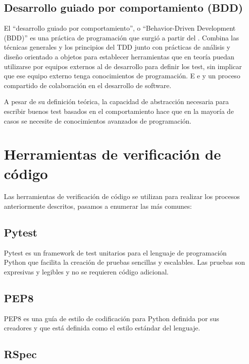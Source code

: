 \subsection {Desarrollo guiado por comportamiento (BDD)}

El ``desarrollo guiado por comportamiento'', o ``Behavior-Driven Development (BDD)'' es una práctica de programación que surgió a partir del . Combina las técnicas generales y los principios del TDD junto con prácticas de análisis y diseño orientado a objetos para establecer herramientas que en teoría puedan utilizarse por equipos externos al de desarrollo para definir los test, sin implicar que ese equipo externo tenga conocimientos de programación. E e y un proceso compartido de colaboración en el desarrollo de software.

\bigskip
A pesar de su definición teórica, la capacidad de abstracción necesaria para escribir buenos test basados en el comportamiento hace que en la mayoría de casos se necesite de conocimientos avanzados de programación.


\section {Herramientas de verificación de código}

Las herramientas de verificación de código se utilizan para realizar los procesos anteriormente descritos, pasamos a enumerar las más comunes:

\subsection {Pytest}

Pytest es un framework de test unitarios para el lenguaje de programación Python que facilita la creación de pruebas sencillas y escalables. Las pruebas son expresivas y legibles y no se requieren código adicional.

\subsection {PEP8}

PEP8 es una guía de estilo de codificación para Python definida por sus creadores y que está definida como el estilo estándar del lenguaje.

\subsection {RSpec}

